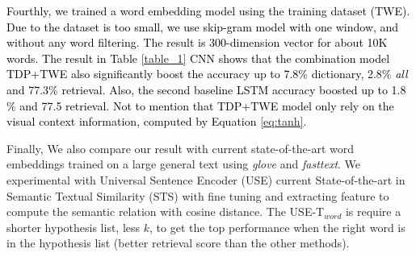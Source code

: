 \documentclass[phd,tocprelim]{cornell}
\begin{document}
\textcolor{black}{Fourthly, we trained a word embedding model using the training dataset (TWE). Due to the dataset is too small, we use skip-gram model with one window, and without any word filtering. The result is 300-dimension vector for about 10K words. The result in Table \ref{table_1} CNN shows that the combination model TDP+TWE also significantly boost the accuracy up to 7.8\% dictionary, 2.8\% \textit{all} and 77.3\% retrieval. Also, the second baseline LSTM accuracy boosted up to 1.8 \% and 77.5 retrieval. Not to mention that TDP+TWE model only rely on the visual context information, computed by Equation \ref{eq:tanh}.} 

Finally,  We also compare our result with current state-of-the-art word embeddings trained on a large general text using  \textit{glove} and \textit{fasttext}. We experimental with Universal Sentence Encoder (USE) current State-of-the-art in Semantic Textual Similarity (STS) with fine tuning and extracting feature to compute the semantic relation with cosine distance. The USE-T$_{word}$ is require a shorter hypothesis list, less $k$, to get the top performance when the right word is in the hypothesis list (better retrieval score than the other methods). 
\end{document}
